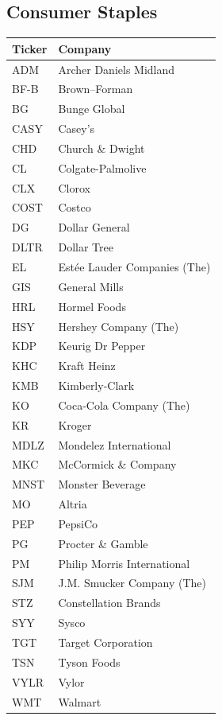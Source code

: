 \documentclass[11pt,a4paper]{article}
\begin{document}
\subsection{Consumer Staples}
\begin{table}[H]
\centering
\small
\begin{tabular}{lp{11cm}}
\hline
Ticker & Company \\
\hline
ADM & Archer Daniels Midland \\
BF-B & Brown–Forman \\
BG & Bunge Global \\
CASY & Casey's \\
CHD & Church \& Dwight \\
CL & Colgate-Palmolive \\
CLX & Clorox \\
COST & Costco \\
DG & Dollar General \\
DLTR & Dollar Tree \\
EL & Estée Lauder Companies (The) \\
GIS & General Mills \\
HRL & Hormel Foods \\
HSY & Hershey Company (The) \\
KDP & Keurig Dr Pepper \\
KHC & Kraft Heinz \\
KMB & Kimberly-Clark \\
KO & Coca-Cola Company (The) \\
KR & Kroger \\
MDLZ & Mondelez International \\
MKC & McCormick \& Company \\
MNST & Monster Beverage \\
MO & Altria \\
PEP & PepsiCo \\
PG & Procter \& Gamble \\
PM & Philip Morris International \\
SJM & J.M. Smucker Company (The) \\
STZ & Constellation Brands \\
SYY & Sysco \\
TGT & Target Corporation \\
TSN & Tyson Foods \\
VYLR & Vylor \\
WMT & Walmart \\
\hline
\end{tabular}
\end{table}
\end{document}
